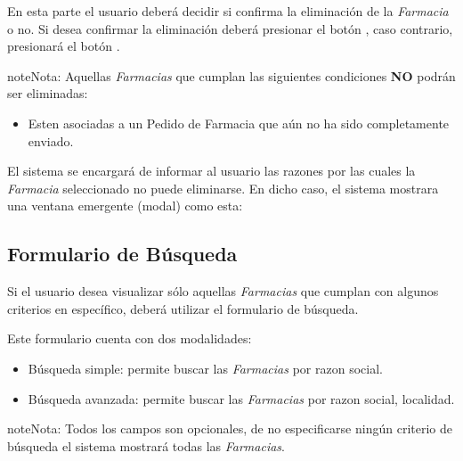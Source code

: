 \documentclass[a4paper,10pt,spanish]{sphinxmanual}
\begin{document}
En esta parte el usuario deberá decidir si confirma la eliminación de la \emph{Farmacia} o no. Si desea confirmar la eliminación deberá presionar el botón , caso contrario, presionará el botón .

\begin{notice}{note}{Nota:}
Aquellas \emph{Farmacias} que cumplan las siguientes condiciones \textbf{NO} podrán ser eliminadas:
\begin{itemize}
\item {} 
Esten asociadas a un Pedido de Farmacia que aún no ha sido completamente enviado.

\end{itemize}

El sistema se encargará de informar al usuario las razones por las cuales la \emph{Farmacia} seleccionado no puede eliminarse. En dicho caso, el sistema mostrara una ventana emergente (modal) como esta:

\end{notice}


\subsection{Formulario de Búsqueda}
\label{farmacias:formulario-de-busqueda}\label{farmacias:formulario-busqueda-farmacia}
Si el usuario desea visualizar sólo aquellas \emph{Farmacias} que cumplan con algunos criterios en específico, deberá utilizar el formulario de búsqueda.


Este formulario cuenta con dos modalidades:
\begin{itemize}
\item {} 
Búsqueda simple: permite buscar las \emph{Farmacias} por razon social.

\item {} 
Búsqueda avanzada: permite buscar las \emph{Farmacias} por razon social, localidad.

\end{itemize}

\begin{notice}{note}{Nota:}
Todos los campos son opcionales, de no especificarse ningún criterio de búsqueda el sistema mostrará todas las \emph{Farmacias}.
\end{notice}
\end{document}
